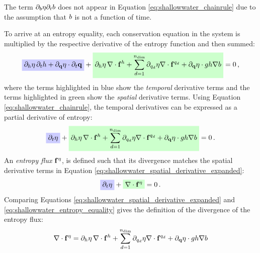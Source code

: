 \begin{remark}
The term $\partial_b\eta\partial_tb$
does not appear in Equation \eqref{eq:shallowwater_chainrule} due to the
assumption that $b$ is not a function of time.
\end{remark}
To arrive at an entropy equality, each conservation equation in the system
is multiplied by the respective derivative of the entropy function and then
summed:
\begin{equation}
  \highlightblue{\partial_\height\entropy\,\partial_\timevalue\height
  + \partial_\heightmomentum\entropy\cdot\partial_\timevalue\heightmomentum}
  + \highlightgreen{\partial_\height\entropy\,\divergence
    \mathbf{\consfluxletter}^\height
  + \sum\limits_{d=1}^{\ndimensions}\partial_{\heightmomentumletter_d}\entropy
    \divergence\mathbf{\consfluxletter}^{\heightmomentumletter_d}
  + \partial_\heightmomentum\entropy\cdot\gravity\height\nabla\bathymetry}
  = 0 \eqc 
\end{equation}
where the terms highlighted in blue show the \emph{temporal} derivative terms
and the terms highlighted in green show the \emph{spatial} derivative terms.
Using Equation \eqref{eq:shallowwater_chainrule}, the temporal derivatives
can be expressed as a partial derivative of entropy:
\begin{equation}\label{eq:shallowwater_spatial_derivative_expanded}
  \highlightblue{\partial_\timevalue\entropy}
  + \highlightgreen{\partial_\height\entropy\,\divergence
    \mathbf{\consfluxletter}^\height
  + \sum\limits_{d=1}^{\ndimensions}\partial_{\heightmomentumletter_d}\entropy
    \divergence\mathbf{\consfluxletter}^{\heightmomentumletter_d}
  + \partial_\heightmomentum\entropy\cdot\gravity\height\nabla\bathymetry}
  = 0 \eqp
\end{equation}
An \emph{entropy flux} $\mathbf{f}^\eta$, is defined such
that its divergence matches the spatial derivative terms in Equation
\eqref{eq:shallowwater_spatial_derivative_expanded}:
\begin{equation}\label{eq:shallowwater_entropy_equality}
  \highlightblue{\partial_\timevalue\entropy}
  + \highlightgreen{\divergence\mathbf{\consfluxletter}^\entropy}
  = 0 \eqp
\end{equation}
Comparing Equations \eqref{eq:shallowwater_spatial_derivative_expanded} and
\eqref{eq:shallowwater_entropy_equality} gives the definition of the
divergence of the entropy flux:
\begin{equation}\label{eq:shallowwater_entropy_flux_start}
  \nabla\cdot\mathbf{f}^\eta
  = 
    \partial_h\eta\,\nabla\cdot
    \mathbf{f}^h
  + \sum\limits_{d=1}^{n_\text{dim}}\partial_{q_d}\eta
    \nabla\cdot\mathbf{f}^{q_d}
  + \partial_{\mathbf{q}}\eta\cdot gh\nabla b
\end{equation}

